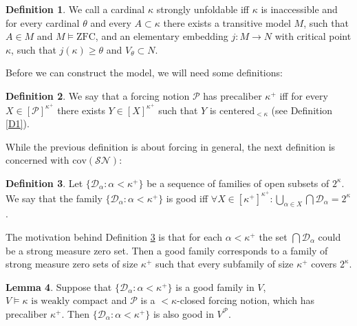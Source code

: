 \documentclass[12pt,a4paper]{scrartcl}
\theoremstyle{definition}
\newtheorem{definition}{Definition}[section]
\newtheorem{lemma}[definition]{Lemma}
\numberwithin{equation}{section}
\begin{document}
\begin{definition} \label{D3}
We call a cardinal $\kappa$ strongly unfoldable iff $\kappa$ is inaccessible and for every cardinal $\theta$ and every $A \subset \kappa$ there exists a transitive model $M$, such that $A \in M$ and $M \vDash \text{ZFC}$, and an elementary embedding $j \colon M \rightarrow N$ with critical point $\kappa$, such that $j(\kappa) \geq \theta$ and $V_\theta \subset N$.
\end{definition}

Before we can construct the model, we will need some definitions: 

\begin{definition}
We say that a forcing notion $\mathcal{P}$ has precaliber $\kappa^+$ iff for every $X \in [\mathcal{P}]^{\kappa^+}$ there exists $Y \in [X]^{\kappa^+}$ such that $Y$ is $\text{centered}_{<\kappa}$ (see Definition \ref{D1}).
\end{definition}

While the previous definition is about forcing in general, the next definition is concerned with $\text{cov}(\mathcal{SN})$:

\begin{definition} \label{D2}
Let $\{\mathcal{D}_\alpha \colon \alpha < \kappa^+\}$ be a sequence of families of open subsets of $2^\kappa$. We say that the family $\{\mathcal{D}_\alpha \colon \alpha < \kappa^+\}$ is good iff $ \forall X \in [\kappa^+]^{\kappa^+} \colon \bigcup_{\alpha \in X} \bigcap \mathcal{D}_\alpha = 2^\kappa$.
\end{definition}

The motivation behind Definition \ref{D2} is that for each $\alpha < \kappa^+$ the set $\bigcap \mathcal{D}_\alpha$ could be a strong measure zero set. Then a good family corresponds to a family of strong measure zero sets of size $\kappa^+$ such that every subfamily of size $\kappa^+$ covers $2^\kappa$.

\begin{lemma}
Suppose that $\{\mathcal{D}_\alpha \colon \alpha < \kappa^+\}$ is a good family in $V$, $V \vDash \kappa \,\, \text{is weakly compact}$ and $\mathcal{P}$ is a ${<}\kappa$-closed forcing notion, which has precaliber $\kappa^+$. Then $\{\mathcal{D}_\alpha \colon \alpha < \kappa^+\}$ is also good in $V^{\mathcal{P}}$.
\end{lemma}
\end{document}
